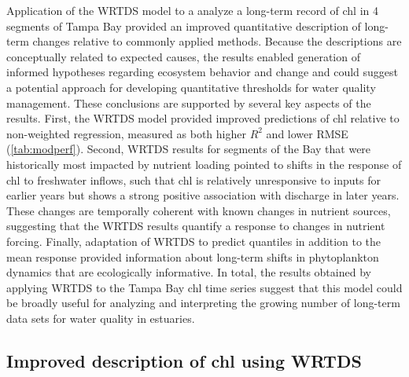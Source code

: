 \documentclass{svjour3}\usepackage[]{graphicx}\usepackage[]{color}
\begin{document}
Application of the \acf{WRTDS} model to a analyze a long-term record of \ac{chl} in 4 segments of Tampa Bay provided an improved quantitative description of long-term changes relative to commonly applied methods.  Because the descriptions are conceptually related to expected causes, the results enabled generation of informed hypotheses regarding ecosystem behavior and change and could suggest a potential approach for developing quantitative thresholds for water quality management.   These conclusions are supported by several key aspects of the results.  First, the \ac{WRTDS} model provided improved predictions of \ac{chl} relative to non-weighted regression, measured as both higher $R^2$ and lower \ac{RMSE} (\cref{tab:modperf}).  Second, \ac{WRTDS} results for segments of the Bay that were historically most impacted by nutrient loading pointed to shifts in the response of \ac{chl} to freshwater inflows, such that \ac{chl} is relatively unresponsive to inputs for earlier years but shows a strong positive association with discharge in later years.  These changes are temporally coherent with known changes in nutrient sources, suggesting that the \ac{WRTDS} results quantify a response to changes in nutrient forcing.  Finally, adaptation of \ac{WRTDS} to predict quantiles in addition to the mean response provided information about long-term shifts in phytoplankton dynamics that are ecologically informative.  In total, the results obtained by applying \ac{WRTDS} to the Tampa Bay \ac{chl} time series suggest that this model could be broadly useful for analyzing and interpreting the growing number of long-term data sets for water quality in estuaries.

\subsection{Improved description of \ac{chl} using \ac{WRTDS}}
\end{document}
